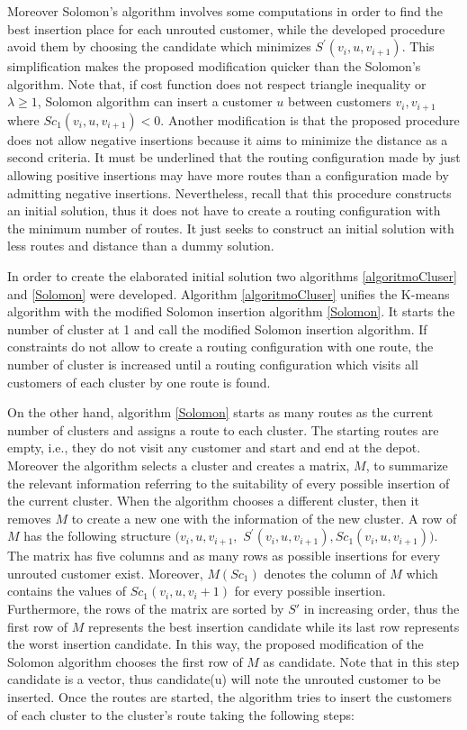 Moreover Solomon's algorithm involves some computations in order to find the best insertion place for each unrouted customer, while the developed procedure avoid them by choosing the candidate which minimizes $S^{'}(v_{i},u,v_{i+1})$. This simplification makes the proposed modification quicker than the Solomon's algorithm. Note that, if cost function does not respect triangle inequality or $\lambda \geq 1$, Solomon algorithm can insert a customer $u$ between customers $v_{i}, v_{i+1}$ where $ Sc_{1}(v_i, u, v_{i+1}) < 0$. Another modification is that the proposed procedure does not allow negative insertions because it aims to minimize the distance as a second criteria. It must be underlined that the routing configuration made by just allowing positive insertions may have more routes than a configuration made by admitting negative insertions. Nevertheless, recall that this procedure constructs an initial solution, thus it does not have to create a routing configuration with the minimum number of routes. It just seeks to construct an initial solution with less routes and distance than a dummy solution. 


In order to create the elaborated initial solution two algorithms \ref{algoritmoCluser} and \ref{Solomon} were developed. Algorithm \ref{algoritmoCluser} unifies the K-means algorithm with the modified Solomon insertion algorithm \ref{Solomon}. It starts the number of cluster at 1 and call the modified Solomon insertion algorithm. If constraints do not allow to create a routing configuration with one route, the number of cluster is increased until a routing configuration which visits all customers of each cluster by one route is found.


On the other hand, algorithm \ref{Solomon} starts as many routes as the current number of clusters and assigns a route to each cluster. The starting routes are empty, i.e., they do not visit any customer and start and end at the depot. Moreover the algorithm selects a cluster and creates a matrix, $M$, to summarize the relevant information referring to the suitability of every possible insertion of the current cluster. When the algorithm chooses a different cluster, then it removes $M$ to create a new one with the information of the new cluster. A row of $M$ has the following structure $(v_i,u, v_{i+1},$ $ S^{'}(v_i, u, v_{i+1}), Sc_{1}(v_i, u, v_{i+1}))$. The matrix has five columns and as many rows as possible insertions for every unrouted customer exist. Moreover, $M(Sc_1)$ denotes the column of $M$ which contains the values of $Sc_1(v_i,u,v_i+1)$ for every possible insertion. Furthermore, the rows of the matrix are sorted by $S{'}$ in increasing order, thus the first row of $M$ represents the best insertion candidate while its last row represents the worst insertion candidate. In this way, the proposed modification of the Solomon algorithm chooses the first row of $M$ as candidate. Note that in this step candidate is a vector, thus candidate(u) will note the unrouted customer to be inserted. Once the routes are started, the algorithm tries to insert the customers of each cluster to the cluster's route taking the following steps:


